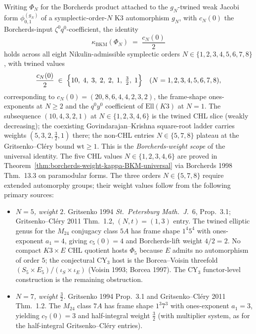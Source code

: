 \begin{corollary}
\label{cor:borcherds-weight-full-8form-scope}
Writing $\Phi_N$ for the Borcherds product attached to the
$g_N$-twined weak Jacobi form $\phi_{0,1}^{(g_N)}$ of a
symplectic-order-$N$ K3 automorphism $g_N$, with $c_N(0)$ the
Borcherds-input $\zeta^0 q^0$-coefficient, the identity
\[
 \kappa_{\mathrm{BKM}}(\Phi_N) \;=\; \frac{c_N(0)}{2}
\]
holds across all eight Nikulin-admissible symplectic orders
$N \in \{1, 2, 3, 4, 5, 6, 7, 8\}$, with twined values
\[
 \frac{c_N(0)}{2}
 \;\in\; \Bigl\{ 10,\; 4,\; 3,\; 2,\; 2,\; 1,\; \tfrac32,\; 1 \Bigr\}
 \quad (N = 1, 2, 3, 4, 5, 6, 7, 8),
\]
corresponding to $c_N(0) = (20, 8, 6, 4, 4, 2, 3, 2)$, the
frame-shape ones-exponents at $N \geq 2$ and the $q^0y^0$ coefficient
of $\mathrm{Ell}(K3)$ at $N = 1$. The subsequence
$(10, 4, 3, 2, 1)$ at $N \in \{1, 2, 3, 4, 6\}$ is the twined CHL
slice (weakly decreasing); the coexisting Govindarajan--Krishna
square-root ladder carries weights $(5, 3, 2, \tfrac32, 1)$ there;
the non-CHL entries $N \in \{5, 7, 8\}$
plateau at the Gritsenko--Cl\'ery bound $\mathrm{wt} \geq 1$.
This is the \emph{Borcherds-weight scope} of the universal identity.
The five CHL values $N \in \{1,2,3,4,6\}$ are proved in
Theorem~\ref{thm:borcherds-weight-kappa-BKM-universal} via Borcherds
1998 Thm.~13.3 on paramodular forms. The three orders $N \in \{5, 7, 8\}$ require extended
automorphy groups; their weight values follow from the following
primary sources:
\begin{itemize}
\item \emph{$N = 5$, weight $2$.}
 Gritsenko 1994 \emph{St.~Petersburg
 Math.~J.}~6, Prop.~3.1; Gritsenko--Cl\'ery 2011 Thm.~1.2,
 $(N,t) = (1,3)$ entry. The twined elliptic genus for the $M_{24}$
 conjugacy class $5A$ has frame shape $1^4 5^4$ with ones-exponent
 $a_1 = 4$, giving $c_5(0) = 4$ and Borcherds-lift weight
 $4/2 = 2$. No compact $K3 \times E$ CHL quotient hosts $\Phi_5$
 because $E$ admits no automorphism of order $5$; the conjectural
 CY$_3$ host is the Borcea--Voisin threefold
 $(S_5 \times E_5)/(\iota_S \times \iota_E)$
 (Voisin 1993; Borcea 1997). The CY$_3$ functor-level construction is
 the remaining obstruction.
\item \emph{$N = 7$, weight $\tfrac32$.}
 Gritsenko 1994 Prop.~3.1 and Gritsenko--Cl\'ery 2011 Thm.~1.2. The
 $M_{24}$ class $7A$ has
 frame shape $1^3 7^3$ with ones-exponent $a_1 = 3$, yielding
 $c_7(0) = 3$ and half-integral weight $\tfrac32$ (with multiplier
 system, as for the half-integral Gritsenko--Cl\'ery entries).

\end{itemize}
\end{corollary}
